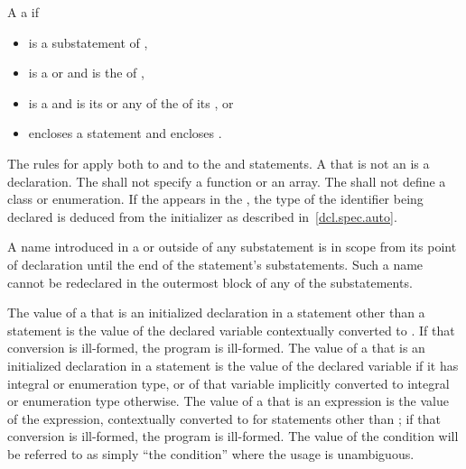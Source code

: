 \pnum
A   
a   if
\begin{itemize}
\item
   is a substatement of ,
\item
   is a  or
   and
   is the  of ,
\item
   is a  and 
  is its  or
  any of the  of
  its , or
\item
   encloses a statement  and  encloses .
\end{itemize}

\pnum
{}%
The rules for  apply both to
 and to the  and 
statements.
A  that is not an  is a
declaration.
The  shall not
specify a function or an array. The  shall not
define a class or enumeration. If the   appears in
the ,
the type of the identifier being declared is deduced from the initializer as described in~\ref{dcl.spec.auto}.

\pnum
{}%
%
\begin{note}
A name introduced in a  or
 outside of any substatement
is in scope from its point of
declaration until the end of the statement's substatements.
Such a name cannot be redeclared in the outermost block of
any of the substatements.
\end{note}

\pnum
The value of a  that is an initialized declaration
in a statement other than a  statement is the value of the
declared variable
contextually converted to .
If that
conversion is ill-formed, the program is ill-formed. The value of a
 that is an initialized declaration in a
 statement is the value of the declared variable if it has
integral or enumeration type, or of that variable implicitly converted
to integral or enumeration type otherwise. The value of a
 that is an expression is the value of the
expression, contextually converted to 
for statements other
than ;
if that conversion is ill-formed, the program is
ill-formed. The value of the condition will be referred to as simply
``the condition'' where the usage is unambiguous.

